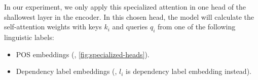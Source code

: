 In our experiment, we only apply this specialized attention in one head of the shallowest layer in the encoder.
In this chosen head, the model will calculate the self-attention weights with keys $k_i$ and queries $q_i$ from one of the following linguistic labels:

\begin{itemize}
	\item POS embeddings (\SpecPOS, \cref{fig:specialized-heads}).
    \item Dependency label embeddings (\SpecDep, $l_i$ is dependency label embedding instead).
\end{itemize}

